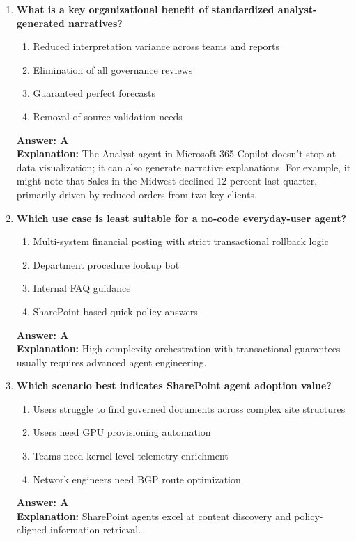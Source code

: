 \documentclass[10pt]{article}
\begin{document}
\begin{enumerate}[leftmargin=*]
\item \textbf{What is a key organizational benefit of standardized analyst-generated narratives?}
\begin{enumerate}[label=\Alph*.]
  \item Reduced interpretation variance across teams and reports
  \item Elimination of all governance reviews
  \item Guaranteed perfect forecasts
  \item Removal of source validation needs
\end{enumerate}
\textbf{Answer: A}\\
\textbf{Explanation:} The Analyst agent in Microsoft 365 Copilot doesn’t stop at data visualization; it can also generate narrative explanations. For example, it might note that Sales in the Midwest declined 12 percent last quarter, primarily driven by reduced orders from two key clients.

\item \textbf{Which use case is least suitable for a no-code everyday-user agent?}
\begin{enumerate}[label=\Alph*.]
  \item Multi-system financial posting with strict transactional rollback logic
  \item Department procedure lookup bot
  \item Internal FAQ guidance
  \item SharePoint-based quick policy answers
\end{enumerate}
\textbf{Answer: A}\\
\textbf{Explanation:} High-complexity orchestration with transactional guarantees usually requires advanced agent engineering.

\item \textbf{Which scenario best indicates SharePoint agent adoption value?}
\begin{enumerate}[label=\Alph*.]
  \item Users struggle to find governed documents across complex site structures
  \item Users need GPU provisioning automation
  \item Teams need kernel-level telemetry enrichment
  \item Network engineers need BGP route optimization
\end{enumerate}
\textbf{Answer: A}\\
\textbf{Explanation:} SharePoint agents excel at content discovery and policy-aligned information retrieval.


\end{enumerate}
\end{document}
